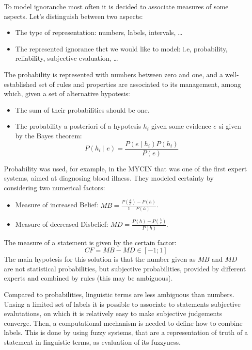 \documentclass[12pt, a4paper]{report}
\theoremstyle{remark}
\theoremstyle{definition}
\begin{document}
    To model ignoranche most often it is decided to associate measures of some aspects. Let's distinguish between two aspects: 
    \begin{itemize}
        \item The type of representation: numbers, labels, intervals, \dots
        \item The represented ignorance thet we would like to model: i.e, probability, reliability, subjective evaluation, \dots
    \end{itemize}

    The probability is represented with numbers between zero and one, and a well-established set of rules and properties are associated 
    to its management, among which, given a set of alternative hypotesis: 
    \begin{itemize}
        \item The sum of their probabilities should be one. 
        \item The probability a posteriori of a hypotesis $h_i$ given some evidence $e$ si given by the Bayes theorem:
            \[P(h_i \mid e)=\frac{P(e \mid h_i)P(h_i)}{P(e)}\]
    \end{itemize}
    Probability was used, for example, in the MYCIN that was one of the first expert systems, aimed at diagnosing blood illness. They 
    modeled certainty by considering two numerical factors: 
    \begin{itemize}
        \item Measure of increased Belief: $MB=\frac{P(\frac{h}{e})-P(h)}{1-P(h)}$.
        \item Measure of decreased Disbelief: $MD=\frac{P(h)-P(\frac{h}{e})}{P(h)}$.
    \end{itemize}
    The measure of a statement is given by the certain factor:
    \[CF=MB-MD \in [-1;1]\]
    The main hypotesis for this solution is that the number given as $MB$ and $MD$ are not statistical probabilities, but subjective
    probabilities, provided by different experts and combined by rules (this may be ambiguous). 

    Compared to probabilities, linguistic terms are less ambiguous than numbers. Unsing a limited set of labels it is possible to associate
    to statements subjective evalutations, on which it is relatively easy to make subjective judgements converge. Then, a computational 
    mechanism is needed to define how to combine labels. This is done by using fuzzy systems, that are a representation of truth  of a 
    statement in linguistic terms, as evaluation of its fuzzyness. 
\end{document}
